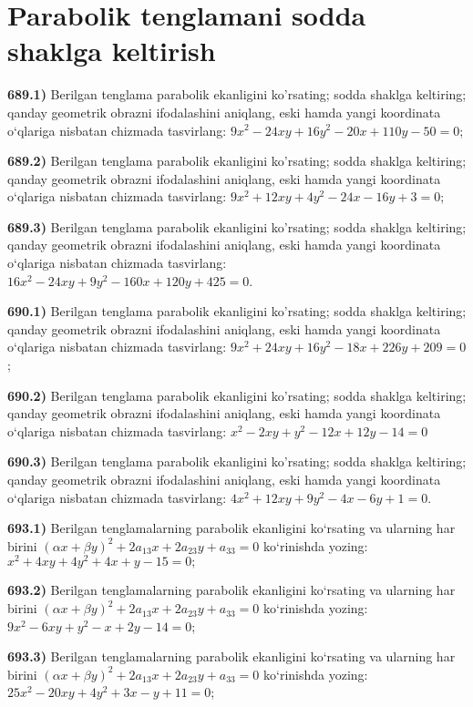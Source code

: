 \section{Parabolik tenglamani sodda shaklga keltirish}



\textbf{689.1)} Berilgan tenglama parabolik ekanligini ko'rsating; sodda shaklga keltiring; qanday geometrik obrazni ifodalashini aniqlang, eski hamda yangi koordinata o‘qlariga nisbatan chizmada tasvirlang: $9 x^2-24 x y+16 y^2-20 x+110 y-50=0$;

\textbf{689.2)} Berilgan tenglama parabolik ekanligini ko'rsating; sodda shaklga keltiring; qanday geometrik obrazni ifodalashini aniqlang, eski hamda yangi koordinata o‘qlariga nisbatan chizmada tasvirlang: $9 x^2+12 x y+4 y^2-24 x-16 y+3=0$;

\textbf{689.3)} Berilgan tenglama parabolik ekanligini ko'rsating; sodda shaklga keltiring; qanday geometrik obrazni ifodalashini aniqlang, eski hamda yangi koordinata o‘qlariga nisbatan chizmada tasvirlang: $16 x^2-24 x y+9 y^2-160 x+120 y+425=0$.

\textbf{690.1)} Berilgan tenglama parabolik ekanligini ko'rsating; sodda shaklga keltiring; qanday geometrik obrazni ifodalashini aniqlang, eski hamda yangi koordinata o‘qlariga nisbatan chizmada tasvirlang: $9 x^2+24 x y+16 y^2-18 x+226 y+209=0$;

\textbf{690.2)} Berilgan tenglama parabolik ekanligini ko'rsating; sodda shaklga keltiring; qanday geometrik obrazni ifodalashini aniqlang, eski hamda yangi koordinata o‘qlariga nisbatan chizmada tasvirlang: $x^2-2 x y+y^2-12 x+12 y-14=0$

\textbf{690.3)} Berilgan tenglama parabolik ekanligini ko'rsating; sodda shaklga keltiring; qanday geometrik obrazni ifodalashini aniqlang, eski hamda yangi koordinata o‘qlariga nisbatan chizmada tasvirlang: $4 x^2+12 x y+9 y^2-4 x-6 y+1=0$.

\textbf{693.1)} Berilgan tenglamalarning parabolik ekanligini ko‘rsating va ularning har birini $(\alpha x+\beta y)^2+2 a_{13} x+2 a_{23} y+a_{33}=0$ ko‘rinishda yozing: $x^2+4 x y+4 y^2+4 x+y-15=0 ;$

\textbf{693.2)} Berilgan tenglamalarning parabolik ekanligini ko‘rsating va ularning har birini $(\alpha x+\beta y)^2+2 a_{13} x+2 a_{23} y+a_{33}=0$ ko‘rinishda yozing: $9 x^2-6 x y+y^2-x+2 y-14=0$;

\textbf{693.3)} Berilgan tenglamalarning parabolik ekanligini ko‘rsating va ularning har birini $(\alpha x+\beta y)^2+2 a_{13} x+2 a_{23} y+a_{33}=0$ ko‘rinishda yozing: $25 x^2-20 x y+4 y^2+3 x-y+11=0$;

